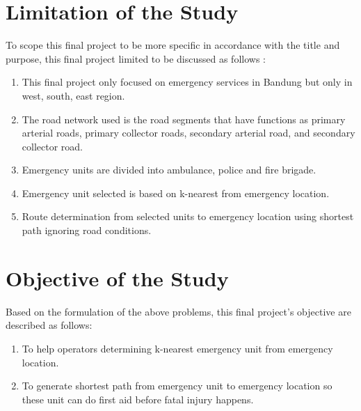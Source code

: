 \section{Limitation of the Study}
To scope this final project to be more specific in accordance with the title and purpose, this final project limited to be discussed as follows :
\begin{enumerate}
    \item This final project only focused on emergency services in Bandung but only in west, south, east region.
    \item The road network used is the road segments that have functions as primary arterial roads, primary collector roads, secondary arterial road, and secondary collector road.
    \item Emergency units are divided into ambulance, police and fire brigade.
    \item Emergency unit selected is based on k-nearest from emergency location.
    \item Route determination from selected units to emergency location using shortest path ignoring road conditions.
\end{enumerate}


\section{Objective of the Study}
Based on the formulation of the above problems, this final project's objective are described as follows:
\begin{enumerate}
    \item To help operators determining k-nearest emergency unit from emergency location.
    \item To generate shortest path from emergency unit to emergency location so these unit can do first aid before fatal injury happens.
\end{enumerate}


\pagebreak
\iflogTA
